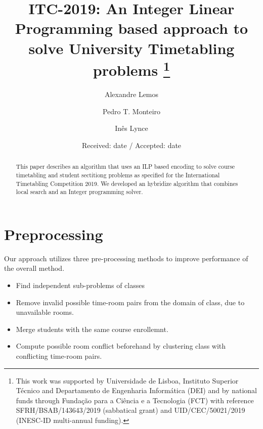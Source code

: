 \documentclass{svjour3}                     %
\begin{document}
\title{ITC-2019: An Integer Linear Programming based approach to solve University Timetabling problems \thanks{This work was supported by Universidade de Lisboa, Instituto Superior T\'ecnico and Departamento de Engenharia Inform\'atica (DEI) and by national funds through Funda\c{c}\~ao para a Ci\^encia e a Tecnologia (FCT) with reference SFRH/BSAB/143643/2019 (sabbatical grant) and UID/CEC/50021/2019 (INESC-ID multi-annual funding).} }


\author{Alexandre Lemos \and
Pedro T. Monteiro \and  In\^es Lynce}
%

%

\date{Received: date / Accepted: date}


\maketitle

\begin{abstract}
This paper describes an algorithm that uses an ILP based encoding to solve course timetabling and student sectitiong problems as specified for the International Timetabling Competition 2019. We developed an hybridize algorithm that combines local search and an Integer programming solver.
\end{abstract}

\section{Preprocessing}

Our approach utilizes three pre-processing methods to improve performance of the overall method.
\begin{itemize}
\item Find independent sub-problems of classes
\item Remove invalid possible time-room pairs from the domain of class, due to unavailable rooms.
\item Merge students with the same course enrollemnt.
\item Compute possible room conflict beforehand by clustering class with conflicting time-room pairs.
\end{itemize}
\end{document}
